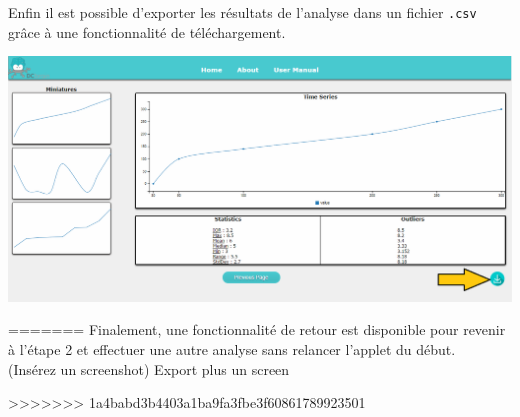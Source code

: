 		Enfin il est possible d'exporter les résultats de l'analyse dans un fichier \lstinline!.csv! grâce à une fonctionnalité de téléchargement.\\
			\begin{center}\includegraphics[scale=0.40]{fenetre3Download.png}\end{center}
=======
		Finalement, une fonctionnalité de retour est disponible pour revenir à l'étape 2 et effectuer une autre analyse sans relancer l'applet du début.\\
			(Insérez un screenshot)
		Export plus un screen
		
>>>>>>> 1a4babd3b4403a1ba9fa3fbe3f60861789923501

